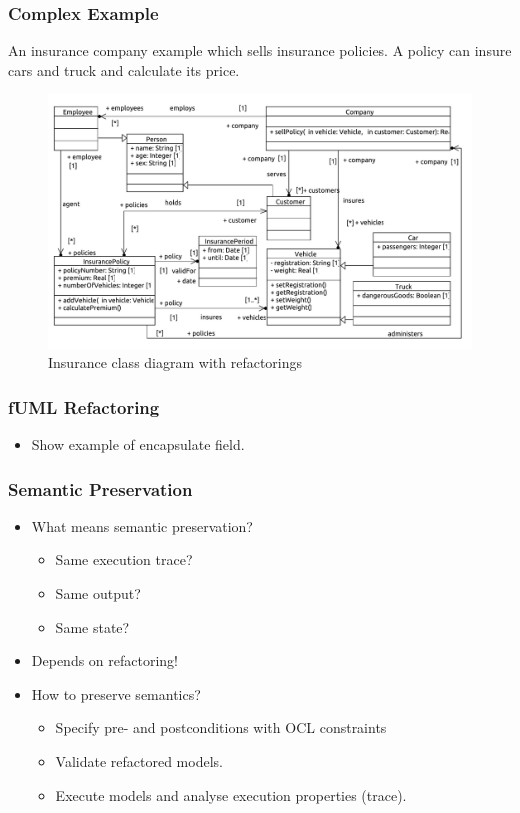 \documentclass{beamer}
\begin{document}
\begin{frame}
\frametitle{Complex Example}
An insurance company example which sells insurance policies. A policy can insure cars and truck and calculate its price.
\begin{figure}[h!t]
 \centering
 \includegraphics[scale=0.4]{images/insurance_ref/Model_Model_ClassDiagram}
 \caption{Insurance class diagram with refactorings}
 \label{fig:classdiagramcomplexRef}
\end{figure}
\end{frame}
        
\begin{frame}
\frametitle{fUML Refactoring}
    \begin{itemize}
     \item Show example of encapsulate field.
    \end{itemize}
\end{frame}
        
\begin{frame}
\frametitle{Semantic Preservation}
\begin{itemize}
 \item What means semantic preservation?
 \begin{itemize}
  \item Same execution trace?
  \item Same output?
  \item Same state?
 \end{itemize}
 \item Depends on refactoring!
 \item How to preserve semantics?
 \begin{itemize}
  \item Specify pre- and postconditions with OCL constraints
  \item Validate refactored models.
  \item Execute models and analyse execution properties (trace).
 \end{itemize}
\end{itemize}

\end{frame}
        
\end{document}
